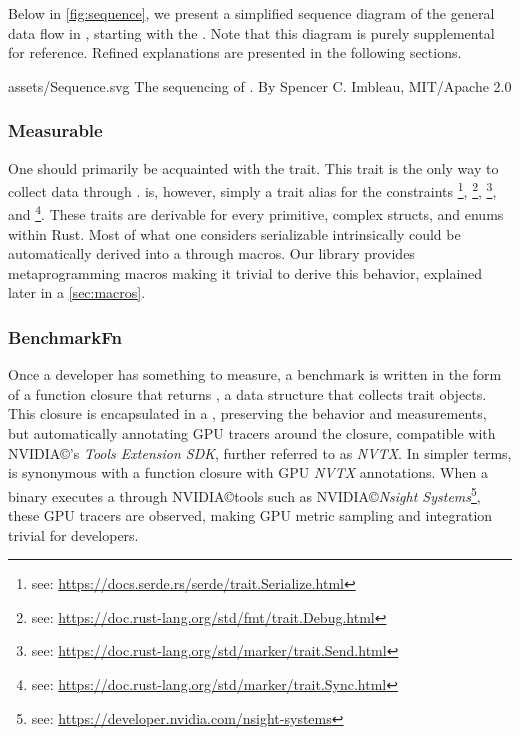 Below in \cref{fig:sequence}, we present a simplified sequence diagram of the general data flow in \toolname, starting with the . Note that this diagram is purely supplemental for reference. Refined explanations are presented in the following sections.

\widesvg
{assets/Sequence.svg}
{The sequencing of \toolname.\label{fig:sequence}}
{By Spencer C. Imbleau, MIT/Apache 2.0}
\medskip

\subsubsection{Measurable}
One should primarily be acquainted with the  trait. This trait is the only way to collect data through \toolname.  is, however, simply a trait alias for the constraints \footnote{see: \href{https://docs.serde.rs/serde/trait.Serialize.html}{https://docs.serde.rs/serde/trait.Serialize.html}}, \footnote{see: \href{https://doc.rust-lang.org/std/fmt/trait.Debug.html}{https://doc.rust-lang.org/std/fmt/trait.Debug.html}}, \footnote{see: \href{https://doc.rust-lang.org/std/marker/trait.Send.html}{https://doc.rust-lang.org/std/marker/trait.Send.html}}, and \footnote{see: \href{https://doc.rust-lang.org/std/marker/trait.Sync.html}{https://doc.rust-lang.org/std/marker/trait.Sync.html}}. These traits are derivable for every primitive, complex structs, and enums within Rust. Most of what one considers serializable intrinsically could be automatically derived into a  through macros. Our library provides metaprogramming macros making it trivial to derive this behavior, explained later in a \cref{sec:macros}.

\subsubsection{BenchmarkFn}\label{sec:benchmarkfn}
Once a developer has something to measure, a benchmark is written in the form of a function closure that returns , a data structure that collects  trait objects. This closure is encapsulated in a , preserving the behavior and measurements, but automatically annotating GPU tracers around the closure, compatible with NVIDIA\copyright's \textit{Tools Extension SDK}, further referred to as \emph{NVTX}. In simpler terms,  is synonymous with a function closure with GPU \textit{NVTX} annotations. When a binary executes a  through NVIDIA\copyright tools such as NVIDIA\copyright \textit{Nsight Systems}\footnote{see: \href{https://developer.nvidia.com/nsight-systems}{https://developer.nvidia.com/nsight-systems}}, these GPU tracers are observed, making GPU metric sampling and integration trivial for developers.

